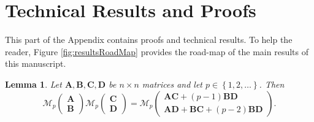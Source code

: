 \documentclass[12pt]{article}
\theoremstyle{plain}
\newtheorem{lemma}[theorem]{Lemma}
\theoremstyle{remark}
\newcommand{\curly}[1]{\left\{ #1 \right\}}
\newcommand{\Mv}[3]{\mathcal{M}_{#1}\begin{pmatrix}
	#2\\
	#3
\end{pmatrix}}
\newcommand{\latMatr}[1]{\mathbf{#1}}          %
\begin{document}

% 

\newpage
\appendix
\section{Technical Results and Proofs} 
\label{A_proofs}
This part of the Appendix contains proofs and technical results. To help the reader, Figure \ref{fig:resultsRoadMap} provides the road-map of the main results of this manuscript.
\begin{lemma}
        \label{lem:MpMp_expr}
    	Let ${\latMatr{A}},{\latMatr{B}},{\latMatr{C}},{\latMatr{D}}$ be $n \times n$ matrices and let $p\in\curly{1,2,\dots}$. Then
    		\begin{equation}
    			\Mv{p}{{\latMatr{A}}}{{\latMatr{B}}} \Mv{p}{{\latMatr{C}}}{{\latMatr{D}}} = \Mv{p}{{\latMatr{A}}{\latMatr{C}}+(p-1){\latMatr{B}}{\latMatr{D}}}{{\latMatr{A}}{\latMatr{D}}+{\latMatr{B}}{\latMatr{C}}+(p-2){\latMatr{B}}{\latMatr{D}}}.
    		\end{equation}
    \end{lemma}
\end{document}

